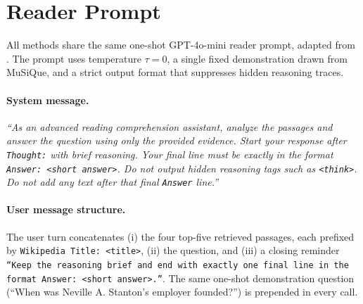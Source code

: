 %
%
%   
%
%
%

\section{Reader Prompt}
\label{app:reader-prompt}

All methods share the same one-shot GPT-4o-mini reader prompt, adapted
from \citet{gutierrez2025hipporag}. The prompt uses temperature
$\tau = 0$, a single fixed demonstration drawn from MuSiQue, and a
strict output format that suppresses hidden reasoning traces.

\paragraph{System message.}
\textit{``As an advanced reading comprehension assistant, analyze the
passages and answer the question using only the provided evidence.
Start your response after \texttt{Thought:} with brief reasoning. Your
final line must be exactly in the format \texttt{Answer: <short
answer>}. Do not output hidden reasoning tags such as \texttt{<think>}.
Do not add any text after that final \texttt{Answer} line.''}

\paragraph{User message structure.}
The user turn concatenates (i) the four top-five retrieved passages,
each prefixed by \texttt{Wikipedia Title: <title>}, (ii) the question,
and (iii) a closing reminder \texttt{``Keep the reasoning brief and
end with exactly one final line in the format \texttt{Answer: <short
answer>}.''}. The same one-shot demonstration question (``When was
Neville A. Stanton's employer founded?'') is prepended in every call.

